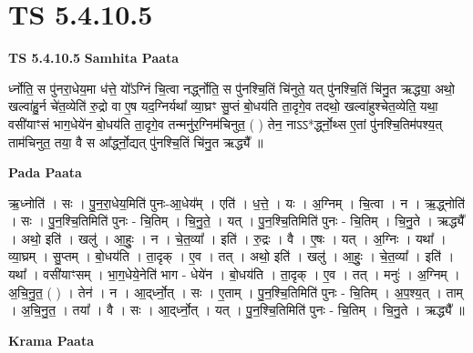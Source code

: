 \documentclass[17pt]{extarticle}
\begin{document}
\section{ TS 5.4.10.5 }

\textbf{TS 5.4.10.5 } \newline
\textbf{Samhita Paata} \newline

र्ध्नोति॒ स पु॑नरा॒धेय॒मा ध॑त्ते॒ यो᳚ऽग्निं चि॒त्वा नर्द्ध्नोति॒ स पु॑नश्चि॒तिं चि॑नुते॒ यत् पु॑नश्चि॒तिं चि॑नु॒त ऋद्ध्या॒ अथो॒ खल्वा॑हु॒र्न चे॑त॒व्येति॑ रु॒द्रो वा ए॒ष यद॒ग्निर्यथा᳚ व्या॒घ्रꣳ सु॒प्तं बो॒धय॑ति ता॒दृगे॒व तदथो॒ खल्वा॑हुश्चेत॒व्येति॒ यथा॒ वसी॑याꣳसं भाग॒धेये॑न बो॒धय॑ति ता॒दृगे॒व तन्मनु॑र॒ग्निम॑चिनुत॒ ( ) तेन॒ नाऽऽ*र्द्ध्नो॒थ्स ए॒तां पु॑नश्चि॒तिम॑पश्य॒त् ताम॑चिनुत॒ तया॒ वै स आ᳚र्द्ध्नो॒द्यत् पु॑नश्चि॒तिं चि॑नु॒त ऋद्ध्यै᳚ ॥ \newline

\textbf{Pada Paata} \newline

ऋ॒ध्नोति॑ । सः । पु॒न॒रा॒धेय॒मिति॑ पुनः-आ॒धेय᳚म् । एति॑ । ध॒त्ते॒ । यः । अ॒ग्निम् । चि॒त्वा । न । ऋ॒द्ध्नोति॑ । सः । पु॒न॒श्चि॒तिमिति॑ पुनः - चि॒तिम् । चि॒नु॒ते॒ । यत् । पु॒न॒श्चि॒तिमिति॑ पुनः - चि॒तिम् । चि॒नु॒ते । ऋद्ध्यै᳚ । अथो॒ इति॑ । खलु॑ । आ॒हुः॒ । न । चे॒त॒व्या᳚ । इति॑ । रु॒द्रः । वै । ए॒षः । यत् । अ॒ग्निः । यथा᳚ । व्या॒घ्रम् । सु॒प्तम् । बो॒धय॑ति । ता॒दृक् । ए॒व । तत् । अथो॒ इति॑ । खलु॑ । आ॒हुः॒ । चे॒त॒व्या᳚ । इति॑ । यथा᳚ । वसी॑याꣳसम् । भा॒ग॒धेये॒नेति॑ भाग - धेये॑न । बो॒धय॑ति । ता॒दृक् । ए॒व । तत् । मनुः॑ । अ॒ग्निम् । अ॒चि॒नु॒त॒ ( ) । तेन॑ । न । आ॒द्‌र्ध्नो॒त् । सः । ए॒ताम् । पु॒न॒श्चि॒तिमिति॑ पुनः - चि॒तिम् । अ॒प॒श्य॒त् । ताम् । अ॒चि॒नु॒त॒ । तया᳚ । वै । सः । आ॒द्‌र्ध्नो॒त् । यत् । पु॒न॒श्चि॒तिमिति॑ पुनः - चि॒तिम् । चि॒नु॒ते । ऋद्ध्यै᳚ ॥  \newline


\textbf{Krama Paata} \newline
\end{document}
